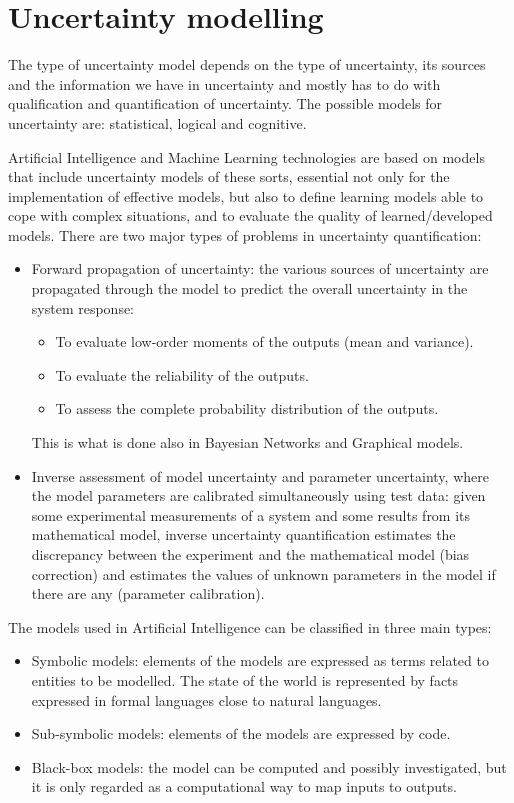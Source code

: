 \documentclass[12pt, a4paper]{report}
\newtheorem[L]{theorem}{Theorem}
\newtheorem[M]{corollary}{Corollary}
\newtheorem[M]{lemma}{Lemma}
\newtheorem[style=S,bodystyle=\normalfont]{definition}{Definition}
\begin{document}
    \section{Uncertainty modelling}
    The type of uncertainty model depends on the type of uncertainty, its sources and the information we have in uncertainty and mostly
    has to do with qualification and quantification of uncertainty. The possible models for uncertainty are: statistical, logical and
    cognitive.

    Artificial Intelligence and Machine Learning technologies are based on models that include uncertainty models of these sorts, essential
    not only for the implementation of effective models, but also to define learning models able to cope with complex situations, and 
    to evaluate the quality of learned/developed models. 
    There are two major types of problems in uncertainty quantification: 
    \begin{itemize}
        \item Forward propagation of uncertainty: the various sources of uncertainty are propagated through the model to predict the overall
            uncertainty in the system response:
            \begin{itemize}
                \item To evaluate low-order moments of the outputs (mean and variance).
                \item To evaluate the reliability of the outputs.
                \item To assess the complete probability distribution of the outputs. 
            \end{itemize}
            This is what is done also in Bayesian Networks and Graphical models. 
        \item Inverse assessment of model uncertainty and parameter uncertainty, where the model parameters are calibrated simultaneously
            using test data: given some experimental measurements of a system and some results from its mathematical model, inverse 
            uncertainty quantification estimates the discrepancy between the experiment and the mathematical model (bias correction) and
            estimates the values of unknown parameters in the model if there are any (parameter calibration).
    \end{itemize}
    The models used in Artificial Intelligence can be classified in three main types: 
    \begin{itemize}
        \item Symbolic models: elements of the models are expressed as terms related to entities to be modelled. The state of the world is
            represented by facts expressed in formal languages close to natural languages.
        \item Sub-symbolic models: elements of the models are expressed by code. 
        \item Black-box models: the model can be computed and possibly investigated, but it is only regarded as a computational way to map
            inputs to outputs. 
    \end{itemize}
\end{document}
